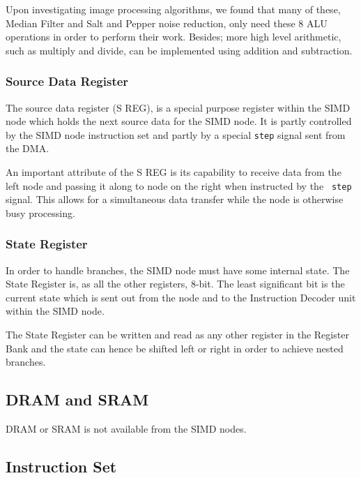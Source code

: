 
Upon investigating image processing algorithms, we found that many of these,
Median Filter and Salt and Pepper noise reduction, only need these 8 \ac{ALU}
operations in order to perform their work. Besides; more high level arithmetic,
such as multiply and divide, can be implemented using addition and subtraction.
\subsubsection{Source Data Register}
The source data register (S REG), is a special purpose register within the
\ac{SIMD} node which holds the next source data for the \ac{SIMD} node. It is
partly controlled by the \ac{SIMD} node instruction set and partly by a special
{\tt step} signal sent from the \ac{DMA}.

An important attribute of the S REG is its capability to receive data from the
left node and passing it along to node on the right when instructed by the {\tt
  step} signal. This allows for a simultaneous data transfer while the node is
otherwise busy processing.

\subsubsection{State Register}
In order to handle branches, the \ac{SIMD} node must have some internal
state. The State Register is, as all the other registers, 8-bit. The least
significant bit is the current state which is sent out from the node and to the
Instruction Decoder unit within the \ac{SIMD} node.

The State Register can be written and read as any other register in the Register
Bank and the state can hence be shifted left or right in order to achieve nested
branches.

\subsection{DRAM and SRAM}


\ac{DRAM} or \ac{SRAM} is not available from the \ac{SIMD} nodes.

\subsection{Instruction Set}

